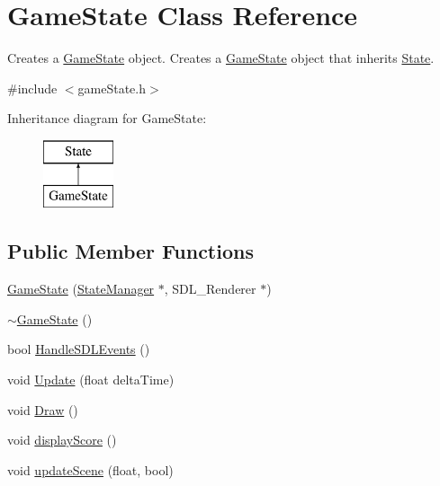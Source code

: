 \hypertarget{class_game_state}{\section{Game\+State Class Reference}
\label{class_game_state}
}


Creates a \hyperlink{class_game_state}{Game\+State} object. Creates a \hyperlink{class_game_state}{Game\+State} object that inherits \hyperlink{class_state}{State}.  




{\ttfamily \#include $<$game\+State.\+h$>$}

Inheritance diagram for Game\+State\+:\begin{figure}[H]
\begin{center}
\leavevmode
\includegraphics[height=2.000000cm]{class_game_state}
\end{center}
\end{figure}
\subsection*{Public Member Functions}
\begin{DoxyCompactItemize}
\item 
\hyperlink{class_game_state_a0e812c09d724c03147ad6721b4d7bd73}{Game\+State} (\hyperlink{class_state_manager}{State\+Manager} $\ast$, S\+D\+L\+\_\+\+Renderer $\ast$)
\item 
\hyperlink{class_game_state_ae623df5042cd0c17daa3394fdcb397b3}{$\sim$\+Game\+State} ()
\item 
bool \hyperlink{class_game_state_a5e2467775e9a941d482e0489295c363d}{Handle\+S\+D\+L\+Events} ()
\item 
void \hyperlink{class_game_state_a2ea32b0cd5f747ef6223d182f415a6c4}{Update} (float delta\+Time)
\item 
void \hyperlink{class_game_state_ab9330b36c7c74d733c2739c025285c64}{Draw} ()
\item 
void \hyperlink{class_game_state_af45ac6c893265a41b011bba850dc840a}{display\+Score} ()
\item 
void \hyperlink{class_game_state_ab22e8c062ae3d629044b93faba688974}{update\+Scene} (float, bool)
\end{DoxyCompactItemize}
